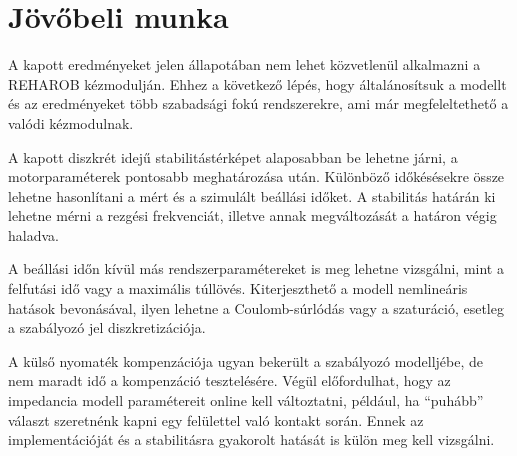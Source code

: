 \chapter{Jövőbeli munka}\label{chap:conclusion}

A kapott eredményeket jelen állapotában nem lehet közvetlenül alkalmazni a REHAROB kézmodulján. 
Ehhez a következő lépés, hogy  általánosítsuk a modellt és az eredményeket több szabadsági fokú rendszerekre, ami már megfeleltethető a valódi kézmodulnak. 

A kapott diszkrét idejű stabilitástérképet alaposabban be lehetne járni, 
a motorparaméterek pontosabb meghatározása után. Különböző időkésésekre össze lehetne hasonlítani 
a mért és a szimulált beállási időket. A stabilitás határán ki lehetne mérni a rezgési frekvenciát, 
illetve annak megváltozását a határon végig haladva. 

A beállási időn kívül más rendszerparamétereket 
is meg lehetne vizsgálni, mint a felfutási idő vagy a maximális túllövés. Kiterjeszthető a modell 
nemlineáris hatások bevonásával, ilyen lehetne a Coulomb-súrlódás vagy a szaturáció, esetleg a 
szabályozó jel diszkretizációja. 

A külső nyomaték kompenzációja ugyan bekerült a 
szabályozó modelljébe, de nem maradt idő a kompenzáció tesztelésére. Végül előfordulhat, 
hogy az impedancia modell paramétereit online kell változtatni, például, ha ``puhább'' választ 
szeretnénk kapni egy felülettel való kontakt során. Ennek az implementációját és a stabilitásra 
gyakorolt hatását is külön meg kell vizsgálni.
